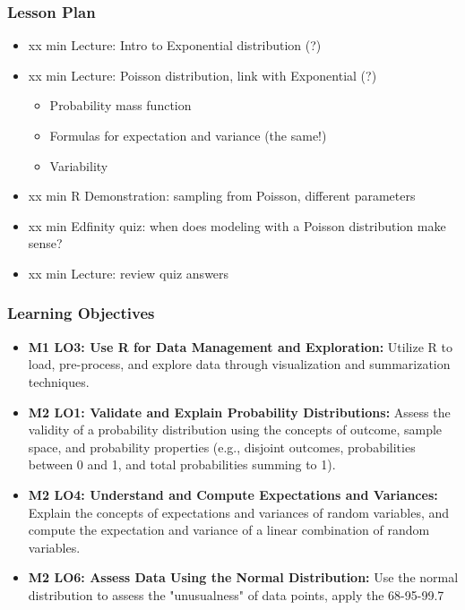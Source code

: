 \begin{frame}
    \frametitle{Lesson Plan}
    \begin{itemize}
        \item xx min Lecture: Intro to Exponential distribution (?)
        \item xx min Lecture: Poisson distribution, link with Exponential (?)
        \begin{itemize}
            \item Probability mass function
            \item Formulas for expectation and variance (the same!)
            \item Variability
        \end{itemize}
        \item xx min R Demonstration: sampling from Poisson, different parameters
        \item xx min Edfinity quiz: when does modeling with a Poisson distribution make sense?
        \item xx min Lecture: review quiz answers
    \end{itemize}
\end{frame}
    
\begin{frame}
    \frametitle{Learning Objectives}
    \begin{itemize}
        \item \textbf{M1 LO3: Use R for Data Management and Exploration:} Utilize R to load, pre-process, and explore data through visualization and summarization techniques.
        \item \textbf{M2 LO1: Validate and Explain Probability Distributions:} Assess the validity of a probability distribution using the concepts of outcome, sample space, and probability properties (e.g., disjoint outcomes, probabilities between 0 and 1, and total probabilities summing to 1).
        \item \textbf{M2 LO4: Understand and Compute Expectations and Variances:} Explain the concepts of expectations and variances of random variables, and compute the expectation and variance of a linear combination of random variables.
        \item \textbf{M2 LO6: Assess Data Using the Normal Distribution:} Use the normal distribution to assess the "unusualness" of data points, apply the 68-95-99.7%
    \end{itemize}
\end{frame}

